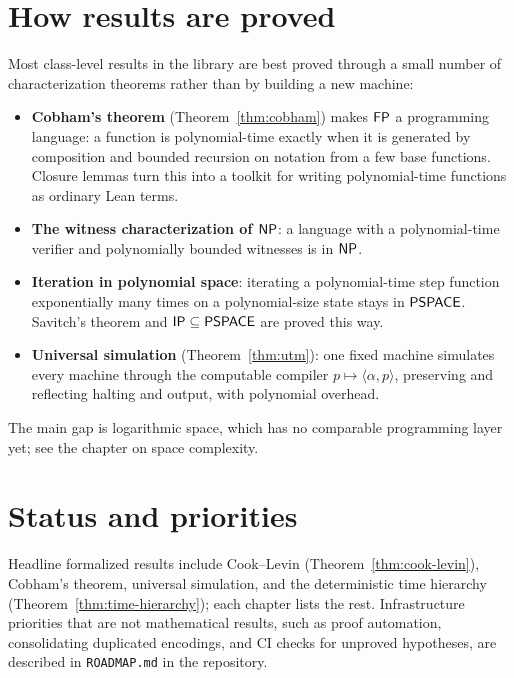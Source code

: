 \section{How results are proved}

Most class-level results in the library are best proved through a small number
of characterization theorems rather than by building a new machine:

\begin{itemize}
  \item \textbf{Cobham's theorem} (Theorem~\ref{thm:cobham}) makes $\mathsf{FP}$ a
    programming language: a function is polynomial-time exactly when it is
    generated by composition and bounded recursion on notation from a few base
    functions. Closure lemmas turn this into a toolkit for writing
    polynomial-time functions as ordinary Lean terms.
  \item \textbf{The witness characterization of $\mathsf{NP}$}: a language with a
    polynomial-time verifier and polynomially bounded witnesses is in
    $\mathsf{NP}$.
  \item \textbf{Iteration in polynomial space}: iterating a polynomial-time
    step function exponentially many times on a polynomial-size state stays in
    $\mathsf{PSPACE}$. Savitch's theorem and $\mathsf{IP} \subseteq \mathsf{PSPACE}$ are
    proved this way.
  \item \textbf{Universal simulation} (Theorem~\ref{thm:utm}): one fixed
    machine simulates every machine through the computable compiler
    $p \mapsto \langle \alpha, p \rangle$, preserving and reflecting halting and
    output, with polynomial overhead.
\end{itemize}

The main gap is logarithmic space, which has no comparable programming layer
yet; see the chapter on space complexity.

\section{Status and priorities}

Headline formalized results include Cook--Levin
(Theorem~\ref{thm:cook-levin}), Cobham's theorem, universal simulation, and the
deterministic time hierarchy (Theorem~\ref{thm:time-hierarchy}); each chapter
lists the rest. Infrastructure priorities that are not mathematical results,
such as proof automation, consolidating duplicated encodings, and CI checks for
unproved hypotheses, are described in \texttt{ROADMAP.md} in the repository.
